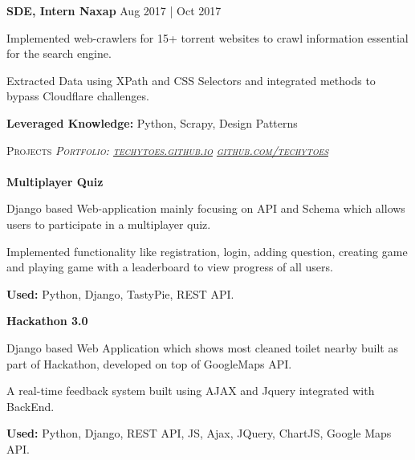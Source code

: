 \documentclass[a4paper]{article}
\newcommand{\lineunder} {
    \vspace*{-8pt} \\
    \hspace*{-18pt} \hrulefill \\
}
\newcommand{\header} [1] {
    {\hspace*{-18pt}\vspace*{6pt} \textsc{#1}}
    \vspace*{-6pt} \lineunder
}
\begin{document}
\textbf{SDE, Intern  \hfill Naxap} \hfill Aug 2017 | Oct 2017\\
\vspace{-1mm}
\begin{itemize} \itemsep 1pt
	\small{\item Implemented web-crawlers for 15+ torrent websites to crawl information essential for the search engine.}
	\small{\item Extracted Data using XPath and CSS Selectors and integrated methods to bypass Cloudflare challenges.}
	\small{\item \textbf{Leveraged Knowledge:} Python, Scrapy, Design Patterns}
\end{itemize}

\header{Projects \hfill \sl \small{Portfolio: \href{http://techytoes.github.io}{techytoes.github.io}} \hfill \faGithub \sl \small{ \href{https://github.com/techytoes}{github.com/techytoes}}}

\textbf{Multiplayer Quiz \href{https://github.com/techytoes/Multiplayer-Quiz}{\faGithub}}
\vspace{-1mm}
\begin{itemize}
	\small{\item Django based Web-application mainly focusing on API and Schema which allows users to participate in a multiplayer quiz.}
	\small{\item Implemented functionality like registration, login, adding question, creating game and playing game with a leaderboard to view progress of all users.}
	\vspace{-1mm}
	\small{\item \textbf{Used:} Python, Django, TastyPie, REST API.}
	\vspace{-1mm}
\end{itemize}

\textbf{Hackathon 3.0 \href{https://github.com/techytoes/publicSanitation}{\faGithub}}
\vspace{-1mm}
\begin{itemize}
	\small{\item Django based Web Application which shows most cleaned toilet nearby built as part of Hackathon, developed on top of GoogleMaps API.}
	\small{\item A real-time feedback system built using AJAX and Jquery integrated with BackEnd.}
	\vspace{-1mm}
	\small{\item \textbf{Used:} Python, Django, REST API, JS, Ajax, JQuery, ChartJS, Google Maps API.}
	\vspace{-1mm}
\end{itemize}
\end{document}
